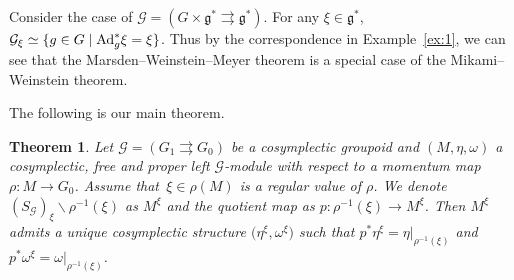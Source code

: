 \documentclass[10pt,a4paper]{amsart}
\numberwithin{equation}{section}
\newtheorem{Theorem}{Theorem}[section]
\begin{document}
\begin{Example}
 Consider the case of $\mathcal{G}=(G\times\mathfrak{g}^\ast\rightrightarrows\mathfrak{g}^\ast)$. For any $\xi\in\mathfrak{g}^\ast$, ${\mathcal{G}_\xi\simeq\{g\in G\mid{\rm Ad}^\ast_g\xi=\xi\}}$. Thus by the correspondence in Example~\ref{ex:1}, we can see that the Marsden--Weinstein--Meyer theorem is a special case of the Mikami--Weinstein theorem.
\end{Example}

The following is our main theorem.


\begin{Theorem}\label{thm:3}
 Let $\mathcal{G}=(G_1\rightrightarrows G_0)$ be a cosymplectic groupoid and $(M,\eta,\omega)$ a cosymplectic, free and proper left $\mathcal{G}$-module with respect to a momentum map $\rho\colon M\to G_0$. Assume that~${\xi\in\rho(M)}$ is a regular value of $\rho$. We denote $(S_{\mathcal{G}})_\xi\backslash \rho^{-1}(\xi)$ as $M^\xi$ and the quotient map as $p\colon\rho^{-1}(\xi)\to M^\xi$. Then $M^\xi$ admits a unique cosymplectic structure $\bigl(\eta^\xi,\omega^\xi\bigr)$ such that $p^\ast\eta^\xi=\eta|_{\rho^{-1}(\xi)}$ and $p^\ast\omega^\xi=\omega|_{\rho^{-1}(\xi)}$.
\end{Theorem}
\end{document}
